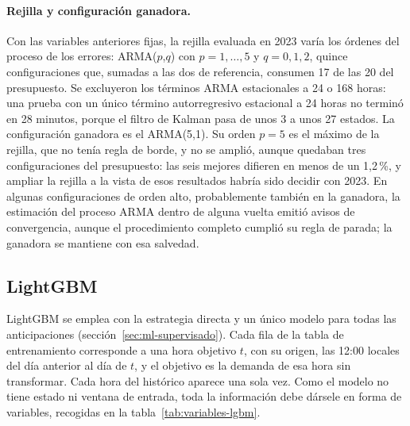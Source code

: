 \paragraph{Rejilla y configuración ganadora.} Con las variables anteriores
fijas, la rejilla evaluada en 2023 varía los órdenes del proceso de los
errores: ARMA($p$,$q$) con $p = 1, \dots, 5$ y $q = 0, 1, 2$, quince
configuraciones que, sumadas a las dos de referencia, consumen 17 de las 20
del presupuesto. Se excluyeron los términos ARMA estacionales a 24 o 168
horas: una prueba con un único término autorregresivo estacional a 24 horas
no terminó en 28 minutos, porque el filtro de Kalman pasa de unos 3 a unos 27
estados. La configuración ganadora es el ARMA(5,1). Su orden $p = 5$ es el
máximo de la rejilla, que no tenía regla de borde, y no se amplió, aunque
quedaban tres configuraciones del presupuesto: las seis mejores difieren en
menos de un 1,2\,\%, y ampliar la rejilla a la vista de esos resultados habría
sido decidir con 2023. En algunas
configuraciones de orden alto, probablemente también en la ganadora, la
estimación del proceso ARMA dentro de alguna vuelta emitió avisos de
convergencia, aunque el procedimiento completo cumplió su regla de parada; la
ganadora se mantiene con esa salvedad.

\subsection{LightGBM}\label{sec:esp-lightgbm}

LightGBM se emplea con la estrategia directa y un único modelo para todas las
anticipaciones (sección~\ref{sec:ml-supervisado}). Cada fila de la tabla de
entrenamiento corresponde a una hora objetivo $t$, con su origen, las 12:00
locales del día anterior al día de $t$, y el objetivo es la demanda de esa
hora sin transformar. Cada hora del histórico aparece una sola vez. Como el
modelo no tiene estado ni ventana de entrada, toda la información debe
dársele en forma de variables, recogidas en la tabla~\ref{tab:variables-lgbm}.

